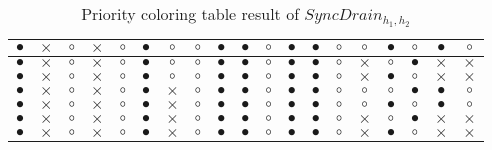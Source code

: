 \begin{BehExample}
\begin{table}
{\begin{tabular}{|c|c|c|c|c|c|c|c|c|c|c|c|c|c|c|c|c|c|c|}
  \hline
  $\bullet$ & $\times$ & $\circ$ & $\times$ & $\circ$ & $\bullet$ & $\circ$ & $\circ$ & $\bullet$ & $\bullet$ & $\circ$ & $\bullet$ & $\bullet$ & $\circ$ & $\circ$ & $\bullet$ & $\circ$ & $\bullet$ & $\circ$ \\ 
  \hline
  $\bullet$ & $\times$ & $\circ$ & $\times$ & $\circ$ & $\bullet$ & $\circ$ & $\circ$ & $\bullet$ & $\bullet$ & $\circ$ & $\bullet$ & $\bullet$ & $\circ$ & $\times$ & $\circ$ & $\bullet$ & $\times$ & $\times$ \\ 
  \hline
  $\bullet$ & $\times$ & $\circ$ & $\times$ & $\circ$ & $\bullet$ & $\circ$ & $\circ$ & $\bullet$ & $\bullet$ & $\circ$ & $\bullet$ & $\bullet$ & $\circ$ & $\times$ & $\bullet$ & $\circ$ & $\times$ & $\times$ \\ 
  \hline
  $\bullet$ & $\times$ & $\circ$ & $\times$ & $\circ$ & $\bullet$ & $\times$ & $\circ$ & $\bullet$ & $\bullet$ & $\circ$ & $\bullet$ & $\bullet$ & $\circ$ & $\circ$ & $\circ$ & $\bullet$ & $\bullet$ & $\circ$ \\ 
  \hline
  $\bullet$ & $\times$ & $\circ$ & $\times$ & $\circ$ & $\bullet$ & $\times$ & $\circ$ & $\bullet$ & $\bullet$ & $\circ$ & $\bullet$ & $\bullet$ & $\circ$ & $\circ$ & $\bullet$ & $\circ$ & $\bullet$ & $\circ$ \\ 
  \hline
  $\bullet$ & $\times$ & $\circ$ & $\times$ & $\circ$ & $\bullet$ & $\times$ & $\circ$ & $\bullet$ & $\bullet$ & $\circ$ & $\bullet$ & $\bullet$ & $\circ$ & $\times$ & $\circ$ & $\bullet$ & $\times$ & $\times$ \\ 
  \hline
  $\bullet$ & $\times$ & $\circ$ & $\times$ & $\circ$ & $\bullet$ & $\times$ & $\circ$ & $\bullet$ & $\bullet$ & $\circ$ & $\bullet$ & $\bullet$ & $\circ$ & $\times$ & $\bullet$ & $\circ$ & $\times$ & $\times$ \\ 
  \hline
\end{tabular}
}
\caption{Priority coloring table result of $SyncDrain_{h_1, h_2}$}
\label{tab:j10}
\end{table}


\end{BehExample}
